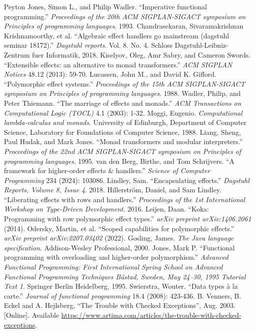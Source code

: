 \documentclass[conference]{IEEEtran}
\begin{document}
    \begin{thebibliography}{00}
         Peyton Jones, Simon L., and Philip Wadler. ``Imperative functional programming.'' \textit{Proceedings of the 20th ACM SIGPLAN-SIGACT symposium on Principles of programming languages}. 1993.
         Chandrasekaran, Sivaramakrishnan Krishnamoorthy, et al. ``Algebraic effect handlers go mainstream (dagstuhl seminar 18172).'' \textit{Dagstuhl reports}. Vol. 8. No. 4. Schloss Dagstuhl-Leibniz-Zentrum fuer Informatik, 2018.
         Kiselyov, Oleg, Amr Sabry, and Cameron Swords. ``Extensible effects: an alternative to monad transformers.'' \textit{ACM SIGPLAN Notices} 48.12 (2013): 59-70.
         Lucassen, John M., and David K. Gifford. ``Polymorphic effect systems.'' \textit{Proceedings of the 15th ACM SIGPLAN-SIGACT symposium on Principles of programming languages}. 1988.
         Wadler, Philip, and Peter Thiemann. ``The marriage of effects and monads.'' \textit{ACM Transactions on Computational Logic (TOCL)} 4.1 (2003): 1-32.
         Moggi, Eugenio. \textit{Computational lambda-calculus and monads}. University of Edinburgh, Department of Computer Science, Laboratory for Foundations of Computer Science, 1988.
         Liang, Sheng, Paul Hudak, and Mark Jones. ``Monad transformers and modular interpreters.'' \textit{Proceedings of the 22nd ACM SIGPLAN-SIGACT symposium on Principles of programming languages}. 1995.
         van den Berg, Birthe, and Tom Schrijvers. ``A framework for higher-order effects \& handlers.'' \textit{Science of Computer Programming} 234 (2024): 103086.
         Lindley, Sam. ``Encapsulating effects.'' \textit{Dagstuhl Reports, Volume 8, Issue 4}. 2018.
         Hillerström, Daniel, and Sam Lindley. ``Liberating effects with rows and handlers.'' \textit{Proceedings of the 1st International Workshop on Type-Driven Development}. 2016.
         Leijen, Daan. ``Koka: Programming with row polymorphic effect types.'' \textit{arXiv preprint arXiv:1406.2061} (2014).
         Odersky, Martin, et al. ``Scoped capabilities for polymorphic effects.'' \textit{arXiv preprint arXiv:2207.03402} (2022).
         Gosling, James. \textit{The Java language specification}. Addison-Wesley Professional, 2000.
         Jones, Mark P. ``Functional programming with overloading and higher-order polymorphism.'' \textit{Advanced
        Functional Programming: First International Spring School on Advanced
        Functional Programming Techniques Båstad, Sweden, May 24–30, 1995
        Tutorial Text 1}. Springer Berlin Heidelberg, 1995.
         Swierstra, Wouter. ``Data types à la carte.'' \textit{Journal of functional programming} 18.4 (2008): 423-436.
         B. Venners, B. Eckel and A. Hejlsberg, ``The Trouble with Checked Exceptions'', Aug. 2003. [Online]. Available \url{https://www.artima.com/articles/the-trouble-with-checked-exceptions}.
    \end{thebibliography}
\end{document}
